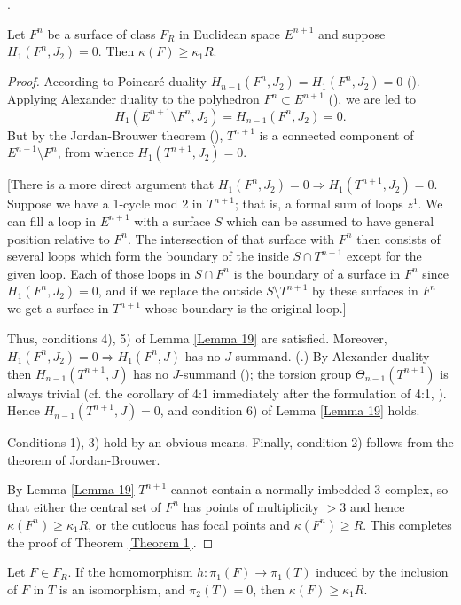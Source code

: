 \documentclass{amsart}
\theoremstyle{plain}
\theoremstyle{definition}
\begin{document}
.
\begin{thm} [= Theorem \ref{Theorem 1}] Let $F^n$ be a surface of class
$F_R$ in Euclidean space $E^{n+1}$ and suppose $H_1(F^n, J_2)
= 0$. Then $\kappa(F) \ge \kappa_1R$.
\end{thm}
\begin{proof} According to Poincar\'e duality $H_{n-1}(F^n,J_2)
= H_1(F^n,J_2) = 0$ (\cite[p. 484 $3.33_2$]{A1}). Applying Alexander
duality to the polyhedron $F^n \subset E^{n+1}$ (\cite[p. 490, 4:13]{A1}), we are led to 
$$H_1(E^{n+1} \setminus F^n, J_2) = H_{n-1}(F^n, J_2) = 0.$$
But by the Jordan-Brouwer theorem (\cite[p. 519, 3:44]{A1}),
$T^{n+1}$ is a connected component of $E^{n+1} \setminus
F^n$, from whence $H_1(T^{n+1}, J_2) = 0$.

[There is a more direct argument that $H_1(F^n, J_2) = 0
\Rightarrow H_1(T^{n+1}, J_2) = 0$. Suppose we have a 1-cycle
mod 2 in $T^{n+1}$; that is, a formal sum of loops $z^1$. We can
fill a loop in $E^{n+1}$ with a surface $S$ which can be assumed
to have general position relative to $F^n$. The intersection of
that surface with $F^n$ then consists of several loops which
form the boundary of the inside $S\cap T^{n+1}$ except for the
given loop. Each of those loops in $S\cap F^n$ is the boundary of
a surface in $F^n$ since $H_1(F^n, J_2) = 0$, and if we replace
the outside $S \setminus T^{n+1}$ by these surfaces in $F^n$
we get a surface in $T^{n+1}$ whose boundary is the original
loop.]

Thus, conditions 4), 5) of Lemma \ref{Lemma 19} are satisfied. Moreover,
$H_1(F^n, J_2) = 0 \Rightarrow H_1(F^n, J)$ has no $J$-summand.
(\cite[p.358, theorem 4:41]{A1}.) By Alexander duality then
$H_{n-1}(T^{n+1}, J)$ has no $J$-summand (\cite[p. 490, 4:1]{A1});
the torsion group $\Theta_{n-1}(T^{n+1})$ is always trivial
(cf. the corollary of 4:1 immediately after the formulation of 4:1,
\cite[p. 490]{A1}). Hence $H_{n-1}(T^{n+1}, J) =0$, and condition 6)
of Lemma \ref{Lemma 19} holds.

Conditions 1), 3) hold by an obvious means. Finally, condition 2)
follows from the theorem of Jordan-Brouwer.

By Lemma \ref{Lemma 19} $T^{n+1}$ cannot contain a normally imbedded
3-complex, so that either the central set of $F^n$ has points
of multiplicity $>3$ and hence $\kappa(F^n) \ge \kappa_1R$, or the
cutlocus has focal points and $\kappa(F^n) \ge R$. This completes
the proof of Theorem \ref{Theorem 1}.
\end{proof}
\begin{thm} [= Theorem \ref{Theorem 2}] Let $F \in F_R$. If the homomorphism
$h: \pi_1(F) \to \pi_1(T)$ induced by the inclusion of $F$ in
$T$ is an isomorphism, and $\pi_2(T) = 0$, then $\kappa(F) \ge
\kappa_1R$.
\end{thm}
\end{document}
